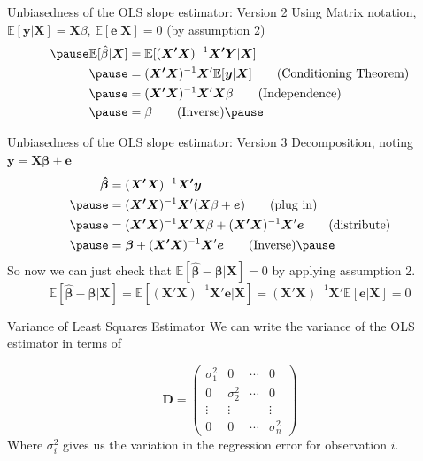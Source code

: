 \documentclass[aspectratio=169, handout]{beamer}
\numberwithin{equation}{section}
\begin{document}
\begin{frame}{Unbiasedness of the OLS slope estimator: Version 2}
Using Matrix notation, $\mathbb{E}[\bm{y}|\bm{X}]=\bm{X}\beta$,  $\mathbb{E}[\bm{e}|\bm{X}]=0$ (by assumption 2)
\begin{align*} \pause
\mathbb{E}[\hat{\beta}|\bm{X}]&=\mathbb{E}[(\bm{X'X})^{-1}\bm{X'Y}|\bm{X}]\\ \pause
&=(\bm{X'X})^{-1}\bm{X}'\mathbb{E}[\bm{y}|\bm{X}] \tag{Conditioning Theorem}\\ \pause
&=(\bm{X'X})^{-1}\bm{X}'\bm{X}\beta \tag{Independence}\\ \pause
&=\beta \tag{Inverse} \pause
\end{align*}
\end{frame}

\begin{frame}{Unbiasedness of the OLS slope estimator: Version 3}
Decomposition, noting $\bm{y}=\bm{X}\bm{\beta}+\bm{e}$ 
\begin{align*}
\bm{\hat{\beta}}&=(\bm{X'X})^{-1}\bm{X'y}\\ \pause
&=(\bm{X'X})^{-1}\bm{X}'(\bm{X}\beta+\bm{e}) \tag{plug in}\\ \pause
&=(\bm{X'X})^{-1}\bm{X}'\bm{X}\beta+(\bm{X'X})^{-1}\bm{X}'\bm{e}  \tag{distribute}\\ \pause
&=\bm{\beta}+(\bm{X'X})^{-1}\bm{X}'\bm{e}\tag{Inverse} \pause
\end{align*}
So now we can just check that $\mathbb{E}[\bm{\hat{\beta}}-\bm{\beta}|\bm{X}]=0$ by applying assumption 2.
$$\mathbb{E}[\bm{\hat{\beta}}-\bm{\beta}|\bm{X}]=\mathbb{E}[(\bm{X'X})^{-1}\bm{X}'\bm{e}|\bm{X}]=(\bm{X'X})^{-1}\bm{X}'\mathbb{E}[\bm{e}|\bm{X}]=0$$
\end{frame}


\begin{frame}{Variance of Least Squares Estimator}
We can write the variance of the OLS estimator in terms of 

$$\bm{D}=\begin{pmatrix} \sigma_1^2 &0 &\cdots& 0 \\ 0& \sigma_2^2& \cdots& 0 \\ \vdots & \vdots & & \vdots\\ 0&0&\cdots &\sigma_n^2\end{pmatrix}$$
Where $\sigma_i^2$ gives us the variation in the regression error for observation $i$.
\end{frame}
\end{document}
